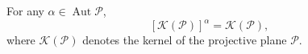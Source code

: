For any $\alpha \in \operatorname{Aut} \mathcal{P}$,
$$[\mathcal{K}(\mathcal{P})]^\alpha = \mathcal{K}(\mathcal{P}),$$
where $\mathcal{K}(\mathcal{P})$ denotes the kernel of the projective plane $\mathcal{P}$.
